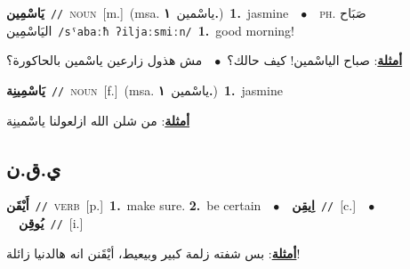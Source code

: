 \documentclass[10pt,a4paper,twoside]{article} %
\begin{document}
\begin{multicols}{2}
{\setlength\topsep{0pt}\textbf{\foreignlanguage{arabic}{يَاسْمِين}}\ {\color{gray}\texttt{//}\color{black}}\ \textsc{noun}\ [m.]\ \color{gray}(msa. \foreignlanguage{arabic}{ياسْمين}~\foreignlanguage{arabic}{\textbf{١.}})\color{black}\ \textbf{1.}~jasmine\ \ $\bullet$\ \ \textsc{ph.} \color{gray} \foreignlanguage{arabic}{صَبَاح اليَاسْمِين}\color{black}\ {\color{gray}\texttt{/{\sffamily sˤabaːħ ʔiljaːsmiːn}/}\color{black}}\ \textbf{1.}~good morning!\  \begin{flushright}\color{gray}\foreignlanguage{arabic}{\textbf{\underline{\foreignlanguage{arabic}{أمثلة}}}: صباح الياسْمين! كيف حالك؟\ $\bullet$\ \  مش هذول زارعين ياسْمين بالحاكورة؟}\end{flushright}\color{black}} \vspace{2mm}

{\setlength\topsep{0pt}\textbf{\foreignlanguage{arabic}{يَاسْمِينِة}}\ {\color{gray}\texttt{//}\color{black}}\ \textsc{noun}\ [f.]\ \color{gray}(msa. \foreignlanguage{arabic}{ياسْمين}~\foreignlanguage{arabic}{\textbf{١.}})\color{black}\ \textbf{1.}~jasmine\  \begin{flushright}\color{gray}\foreignlanguage{arabic}{\textbf{\underline{\foreignlanguage{arabic}{أمثلة}}}: من شلن الله ازلعولنا ياسْمينِة}\end{flushright}\color{black}} \vspace{2mm}

\vspace{-3mm}
\subsection*{\color{blue}\foreignlanguage{arabic}{ي.ق.ن}\color{blue}{}} 

{\setlength\topsep{0pt}\textbf{\foreignlanguage{arabic}{أَيْقَن}}\ {\color{gray}\texttt{//}\color{black}}\ \textsc{verb}\ [p.]\ \textbf{1.}~make sure.  \textbf{2.}~be certain\ \ $\bullet$\ \ \setlength\topsep{0pt}\textbf{\foreignlanguage{arabic}{اِيقِن}}\ {\color{gray}\texttt{//}\color{black}}\ [c.]\ \ $\bullet$\ \ \setlength\topsep{0pt}\textbf{\foreignlanguage{arabic}{يُوقِن}}\ {\color{gray}\texttt{//}\color{black}}\ [i.]\  \begin{flushright}\color{gray}\foreignlanguage{arabic}{\textbf{\underline{\foreignlanguage{arabic}{أمثلة}}}: بس شفته زلمة كبير وبيعيط، أيْقَنن انه هالدنيا زائلة!}\end{flushright}\color{black}} \vspace{2mm}


\end{multicols}
\end{document}
